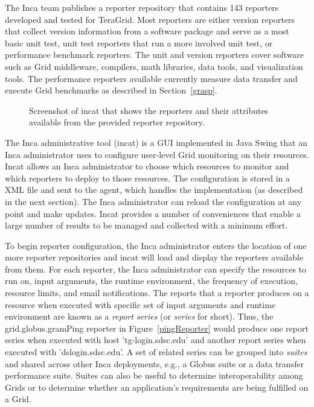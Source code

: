 \documentclass[times,10pt,twocolumn]{article}
\begin{document}
The Inca team publishes a reporter repository that contains 143 reporters
developed and tested for TeraGrid.  Most reporters are either version
reporters that collect version information from a software package and
serve as a most basic unit test, unit test reporters that run a more involved
unit test, or performance benchmark reporters.  The unit and version
reporters cover software such as Grid middleware, compilers, math libraries,
data tools, and visualization tools.  The performance reporters available
currently measure data transfer and execute Grid benchmarks as described in
Section~\ref{grasp}.


\begin{figure}[htb]
  \centering
  \mbox{}
  \caption{\label{arch_fig} Screenshot of incat that shows the reporters
  and their attributes available from the provided reporter repository.}
\end{figure}

The Inca administrative tool (incat) is a GUI implemented in Java Swing that an
Inca administrator uses to configure user-level Grid monitoring on their
resources.  Incat allows an Inca administrator to choose which resources to
monitor and which reporters to deploy to those resources.  The configuration
is stored in a XML file and sent to the agent, which handles the implementation
(as described in the next section).  The Inca administrator can reload the
configuration at any point and make updates.  Incat provides a number of
conveniences that enable a large number of results to be managed and collected
with a minimum effort.  

To begin reporter configuration, the Inca administrator enters the location of
one more reporter repositories and incat will load and display the reporters
available from them.
For each reporter, the Inca administrator can specify the resources to run on,
input arguments, the runtime environment, the frequency of execution, resource
limits, and email notifications.  The reports that a reporter produces on a
resource when executed with specific set of input arguments and runtime
environment are known as a \emph{report series} (or \emph{series} for short).
Thus, the grid.globus.gramPing reporter in Figure~\ref{pingReporter} would
produce one report series when executed with host 'tg-login.sdsc.edu' and
another report series when executed with 'dslogin.sdsc.edu'.  A set of related
series can be grouped into \emph{suites} and shared across other Inca
deployments, e.g.,  a Globus suite or a data transfer
performance suite.  Suites can also be useful to determine interoperability
among Grids or to determine whether an application's requirements are being
fulfilled on a Grid.
\end{document}
